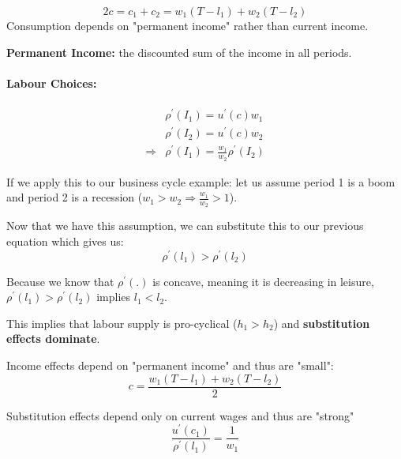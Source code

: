 \documentclass[11pt]{article}
\begin{document}
    \begin{equation}
2 c=c_1+c_2=w_1\left(T-l_1\right)+w_2\left(T-l_2\right)
\end{equation}
Consumption depends on "permanent income" rather than current income. 

\begin{definition}
    \textbf{Permanent Income:} the discounted sum of the income in all periods.
\end{definition}


\paragraph{Labour Choices:} \mbox{}

    \begin{equation}
\begin{aligned}
& \rho^{\prime}\left(I_1\right)=u^{\prime}(c) w_1 \\
& \rho^{\prime}\left(I_2\right)=u^{\prime}(c) w_2 \\
\Rightarrow& \rho^{\prime}\left(I_1\right)=\frac{w_1}{w_2} \rho^{\prime}\left(I_2\right)
\end{aligned}
\end{equation}

If we apply this to our business cycle example: let us assume period 1 is a boom and period 2 is a recession ($w_1>w_2 \Rightarrow \frac{w_1}{w_2}>1$).

Now that we have this assumption, we can substitute this to our previous equation which gives us:
\[\rho^\prime(l_1) > \rho^\prime(l_2)\]

Because we know that $\rho^\prime(.)$ is concave, meaning it is decreasing in leisure, $\rho^\prime(l_1) > \rho^\prime(l_2)$ implies $l_1 <l_2$.

This implies that labour supply is pro-cyclical ($h_1>h_2$) and \textbf{substitution effects dominate}.


\begin{intu}
    Income effects depend on "permanent income" and thus are "small":
    \begin{equation}
c=\frac{w_1\left(T-l_1\right)+w_2\left(T-l_2\right)}{2}
\end{equation}

Substitution effects depend only on current wages and thus are "strong"
\begin{equation}
\frac{u^{\prime}\left(c_1\right)}{\rho^{\prime}\left(l_1\right)}=\frac{1}{w_1}
\end{equation}
\end{intu}
\end{document}
